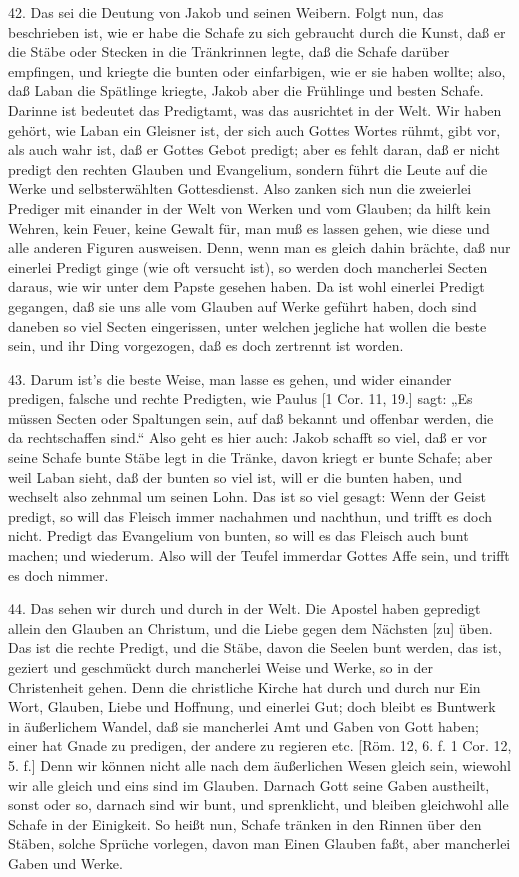 42. Das sei die Deutung von Jakob und seinen Weibern. Folgt nun, das beschrieben ist, wie er habe die Schafe zu sich gebraucht durch die Kunst, daß er die Stäbe oder Stecken in die Tränkrinnen legte, daß die Schafe darüber empfingen, und kriegte die bunten oder einfarbigen, wie er sie haben wollte; also, daß Laban die Spätlinge kriegte, Jakob aber die Frühlinge und besten Schafe. Darinne ist bedeutet das Predigtamt, was das ausrichtet in der Welt. Wir haben gehört, wie Laban ein Gleisner ist, der sich auch Gottes Wortes rühmt, gibt vor, als auch wahr ist, daß er Gottes Gebot predigt; aber es fehlt daran, daß er nicht predigt den rechten Glauben und Evangelium, sondern führt die Leute auf die Werke und selbsterwählten Gottesdienst. Also zanken sich nun die zweierlei Prediger mit einander in der Welt von Werken und vom Glauben; da hilft kein Wehren, kein Feuer, keine Gewalt für, man muß es lassen gehen, wie diese und alle anderen Figuren ausweisen. Denn, wenn man es gleich dahin brächte, daß nur einerlei Predigt ginge (wie oft versucht ist), so werden doch mancherlei Secten daraus, wie wir unter dem Papste gesehen haben. Da ist wohl einerlei Predigt gegangen, daß sie uns alle vom Glauben auf Werke geführt haben, doch sind daneben so viel Secten eingerissen, unter welchen jegliche hat wollen die beste sein, und ihr Ding vorgezogen, daß es doch zertrennt ist worden.

43. Darum ist's die beste Weise, man lasse es gehen, und wider einander predigen, falsche und rechte Predigten, wie Paulus [1 Cor. 11, 19.] sagt: „Es müssen Secten oder Spaltungen sein, auf daß bekannt und offenbar werden, die da rechtschaffen sind.“ Also geht es hier auch: Jakob schafft so viel, daß er vor seine Schafe bunte Stäbe legt in die Tränke, davon kriegt er bunte Schafe; aber weil Laban sieht, daß der bunten so viel ist, will er die bunten haben, und wechselt also zehnmal um seinen Lohn. Das ist so viel gesagt: Wenn der Geist predigt, so will das Fleisch immer nachahmen und nachthun, und trifft es doch nicht. Predigt das Evangelium von bunten, so will es das Fleisch auch bunt machen; und wiederum. Also will der Teufel immerdar Gottes Affe sein, und trifft es doch nimmer.

44. Das sehen wir durch und durch in der Welt. Die Apostel haben gepredigt allein den Glauben an Christum, und die Liebe gegen dem Nächsten [zu] üben. Das ist die rechte Predigt, und die Stäbe, davon die Seelen bunt werden, das ist, geziert und geschmückt durch mancherlei Weise und Werke, so in der Christenheit gehen. Denn die christliche Kirche hat durch und durch nur Ein Wort, Glauben, Liebe und Hoffnung, und einerlei Gut; doch bleibt es Buntwerk in äußerlichem Wandel, daß sie mancherlei Amt und Gaben von Gott haben; einer hat Gnade zu predigen, der andere zu regieren etc. [Röm. 12, 6. f. 1 Cor. 12, 5. f.] Denn wir können nicht alle nach dem äußerlichen Wesen gleich sein, wiewohl wir alle gleich und eins sind im Glauben. Darnach Gott seine Gaben austheilt, sonst oder so, darnach sind wir bunt, und sprenklicht, und bleiben gleichwohl alle Schafe in der Einigkeit. So heißt nun, Schafe tränken in den Rinnen über den Stäben, solche Sprüche vorlegen, davon man Einen Glauben faßt, aber mancherlei Gaben und Werke.

